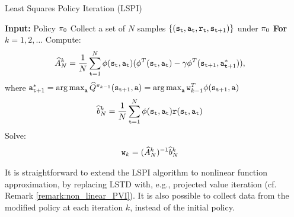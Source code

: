\begin{algorithm}[H]
\caption{Least Squares Policy Iteration (LSPI)}
\begin{algorithmic}[1]
\State \textbf{Input:} Policy $\pi_0$
\State Collect a set of $N$ samples $\{({\tt s}_{\tt t}, {\tt a}_{\tt t}, {\tt r}_{\tt t}, {\tt s}_{{\tt t}+1})\}$ under $\pi_0$
\State \textbf{For} {$k = 1,2,\dots$ }
    \State \quad Compute: 
\begin{align*}
\widehat{A}_N^k &= \frac{1}{N} \sum_{{\tt t}=1}^N {\phi}({\tt s}_{\tt t},{\tt a}_{\tt t})( {\phi}^T({\tt s}_{\tt t},{\tt a}_{\tt t})-\gamma {\phi}^T({\tt s}_{{\tt t}+1},{\tt a}^*_{{\tt t}+1})),
\end{align*}
\qquad where 
$\action^*_{\ttime+1} = \argmax_\action \widehat{Q}^{\policy_{k-1}}(\state_{\ttime+1},\action) = \argmax_\action \weights_{k-1}^T\ftrs(\state_{\ttime+1},\action)$
\begin{align*}
\widehat{b}_N^k &= \frac{1}{N} \sum_{{\tt t}=1}^N  {\phi}({\tt s}_{\tt t}, {\tt a}_{\tt t}) {\tt r}({\tt s}_{\tt t},{\tt a}_{\tt t}) 
\end{align*}
\State \quad Solve: 
\begin{align*}
{\tt w}_k &= (\widehat{A}_N^k)^{-1} \widehat{b}_N^k
\end{align*}
\end{algorithmic}
\end{algorithm}


It is straightforward to extend the LSPI algorithm to nonlinear function approximation, by replacing LSTD with, e.g., projected value iteration (cf. Remark \ref{remark:non_linear_PVI}). It is also possible to collect data from the modified policy at each iteration $k$, instead of the initial policy.

